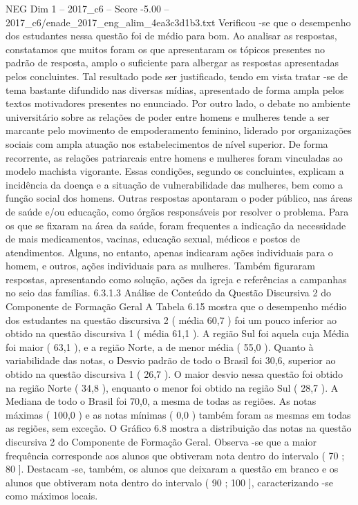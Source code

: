 \begin{textsample}{NEG Dim 1 – 2017\_c6 – Score -5.00 – 2017\_c6/enade\_2017\_eng\_alim\_4ea3c3d1b3.txt}
Verificou -se que o desempenho dos estudantes nessa questão foi de médio para bom.
Ao analisar as respostas, constatamos que muitos foram os que apresentaram os tópicos presentes no padrão de resposta, amplo o suficiente para albergar as respostas apresentadas pelos concluintes.
Tal resultado pode ser justificado, tendo em vista tratar -se de tema bastante difundido nas diversas mídias, apresentado de forma ampla pelos textos motivadores presentes no enunciado.
Por outro lado, o debate no ambiente universitário sobre as relações de poder entre homens e mulheres tende a ser marcante pelo movimento de empoderamento feminino, liderado por organizações sociais com ampla atuação nos estabelecimentos de nível superior.
De forma recorrente, as relações patriarcais entre homens e mulheres foram vinculadas ao modelo machista vigorante.
Essas condições, segundo os concluintes, explicam a incidência da doença e a situação de vulnerabilidade das mulheres, bem como a função social dos homens.
Outras respostas apontaram o poder público, nas áreas de saúde e/ou educação, como órgãos responsáveis por resolver o problema.
Para os que se fixaram na área da saúde, foram frequentes a indicação da necessidade de mais medicamentos, vacinas, educação sexual, médicos e postos de atendimentos.
Alguns, no entanto, apenas indicaram ações individuais para o homem, e outros, ações individuais para as mulheres.
Também figuraram respostas, apresentando como solução, ações da igreja e referências a campanhas no seio das famílias. 6.3.1.3 Análise de Conteúdo da Questão Discursiva 2 do Componente de Formação Geral A Tabela 6.15 mostra que o desempenho médio dos estudantes na questão discursiva 2 ( média 60,7 ) foi um pouco inferior ao obtido na questão discursiva 1 ( média 61,1 ).
A região Sul foi aquela cuja Média foi maior ( 63,1 ), e a região Norte, a de menor média ( 55,0 ).
Quanto à variabilidade das notas, o Desvio padrão de todo o Brasil foi 30,6, superior ao obtido na questão discursiva 1 ( 26,7 ).
O maior desvio nessa questão foi obtido na região Norte ( 34,8 ), enquanto o menor foi obtido na região Sul ( 28,7 ).
A Mediana de todo o Brasil foi 70,0, a mesma de todas as regiões.
As notas máximas ( 100,0 ) e as notas mínimas ( 0,0 ) também foram as mesmas em todas as regiões, sem exceção.
O Gráfico 6.8 mostra a distribuição das notas na questão discursiva 2 do Componente de Formação Geral.
Observa -se que a maior frequência corresponde aos alunos que obtiveram nota dentro do intervalo ( 70 ; 80 ].
Destacam -se, também, os alunos que deixaram a questão em branco e os alunos que obtiveram nota dentro do intervalo ( 90 ; 100 ], caracterizando -se como máximos locais.

\end{textsample}
